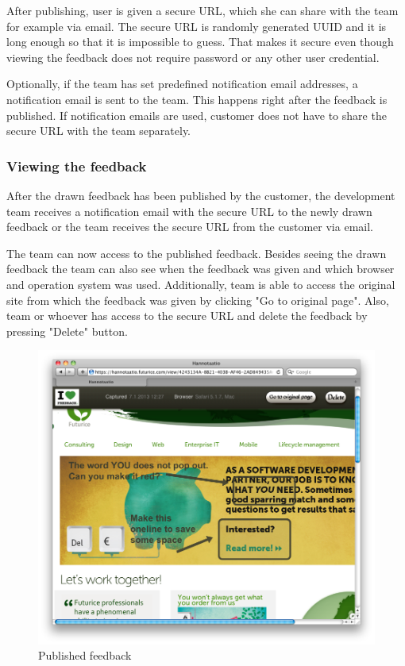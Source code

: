 \documentclass[english,12pt,a4paper,pdftex]{article}
\begin{document}
After publishing, user is given a secure \ac{URL}, which she can share with the team for example via email. The secure \ac{URL} is randomly generated \ac{UUID} and it is long enough so that it is impossible to guess. That makes it secure even though viewing the feedback does not require password or any other user credential.

Optionally, if the team has set predefined notification email addresses, a notification email is sent to the team. This happens right after the feedback is published. If notification emails are used, customer does not have to share the secure \ac{URL} with the team separately.

\subsubsection{Viewing the feedback}

After the drawn feedback has been published by the customer, the development team receives a notification email with the secure \ac{URL} to the newly drawn feedback or the team receives the secure \ac{URL} from the customer via email.

The team can now access to the published feedback. Besides seeing the drawn feedback the team can also see when the feedback was given and which browser and operation system was used. Additionally, team is able to access the original site from which the feedback was given by clicking "Go to original page". Also, team or whoever has access to the secure \ac{URL} and delete the feedback by pressing "Delete" button.

\begin{figure}[htb]
\begin{center}
\includegraphics[width=1.0\textwidth]{published_feedback.png}
\end{center}
\caption{Published feedback}
\end{figure}
\end{document}
